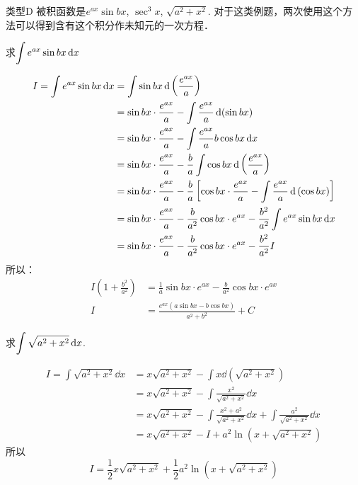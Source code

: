 \begin{blk}
    {类型D} 被积函数是$e^{ax}\sin bx$, $\sec^3 x$, $\sqrt{a^2+x^2}$. 对于这类例题，两次使用这个方法可以得到含有这个积分作未知元的一次方程．
\end{blk}

\begin{example}
    求$\displaystyle\int e^{ax}\sin bx\,{\rm d} x$
\end{example}

\begin{solution}
\[\begin{split}
    I=\displaystyle\int e^{ax}\sin bx\,{\rm d} x
    &=\int \sin bx \,{\rm d}\left(\dfrac{e^{ax}}{a}\right)\\
&=\sin bx\cdot \dfrac{e^{ax}}{a}-\int \dfrac{e^{ax}}{a}\,{\rm d}(\sin bx)\\
&=\sin bx\cdot \dfrac{e^{ax}}{a}-\int \dfrac{e^{ax}}{a}b\cos bx\,{\rm d} x\\
&=\sin bx\cdot \dfrac{e^{ax}}{a}-\dfrac{b}{a}\int \cos bx\,{\rm d}\left(\dfrac{e^{ax}}{a}\right)\\
&=\sin bx\cdot \dfrac{e^{ax}}{a}-\dfrac{b}{a}\left[\cos bx\cdot \dfrac{e^{ax}}{a}-\int \dfrac{e^{ax}}{a}\,{\rm d}\left(\cos bx\right)\right]\\
&=\sin bx\cdot \dfrac{e^{ax}}{a}-\dfrac{b}{a^2}\cos bx\cdot e^{ax}-\dfrac{b^2}{a^2}\int e^{ax}\sin bx\,{\rm d} x\\
&=\sin bx\cdot \dfrac{e^{ax}}{a}-\dfrac{b}{a^2}\cos bx\cdot e^{ax}-\dfrac{b^2}{a^2}I
\end{split}\]
所以：
\[\begin{split}
    I\left(1+\frac{b^2}{a^2}\right)&=\frac{1}{a}\sin bx\cdot e^{ax}-\frac{b}{a^2}\cos bx\cdot e^{ax}\\
    I&=\frac{e^{ax}(a\sin bx-b\cos bx)}{a^2+b^2}+C
\end{split}\]    
\end{solution}

\begin{example}
    求$\displaystyle\int \sqrt{a^2+x^2}\,{\rm d} x$.
\end{example}

\begin{solution}
\[    \begin{split}
    I =\int \sqrt{a^{2}+x^{2}} \dd x 
    &=x \sqrt{a^{2}+x^{2}}-\int x \dd\left(\sqrt{a^{2}+x^{2}}\right) \\
    &=x \sqrt{a^{2}+x^{2}}-\int \frac{x^{2}}{\sqrt{a^{2}+x^{2}}} \dd x \\
    &=x \sqrt{a^{2}+x^{2}}-\int \frac{x^{2}+a^{2}}{\sqrt{a^{2}+x^{2}}} \dd x+\int \frac{a^{2}}{\sqrt{a^{2}+x^{2}}} \dd x \\
    &=x \sqrt{a^{2}+x^{2}}-I+a^{2} \ln \left(x+\sqrt{a^{2}+x^{2}}\right)
    \end{split}\]
    所以
\[    I=\frac{1}{2} x \sqrt{a^{2}+x^{2}}+\frac{1}{2} a^{2} \ln \left(x+\sqrt{a^{2}+x^{2}}\right)\]
\end{solution}

